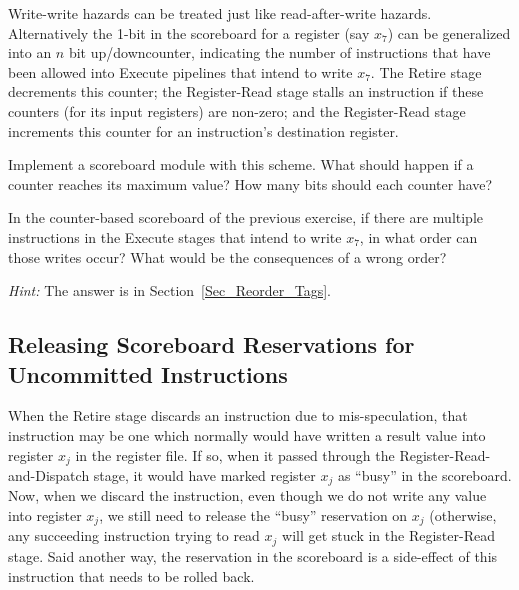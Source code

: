 \Exercise

Write-write hazards can be treated just like read-after-write hazards.
Alternatively the 1-bit in the scoreboard for a register (say $x_7$)
can be generalized into an $n$ bit up/downcounter, indicating the
number of instructions that have been allowed into Execute pipelines
that intend to write $x_7$.  The Retire stage decrements this counter;
the Register-Read stage stalls an instruction if these counters (for
its input registers) are non-zero; and the Register-Read stage
increments this counter for an instruction's destination register.

\vspace{1ex}

Implement a scoreboard module with this scheme.  What should happen if
a counter reaches its maximum value?  How many bits should each
counter have?

\vspace{1ex}

\Exercise

In the counter-based scoreboard of the previous exercise, if there are
multiple instructions in the Execute stages that intend to write
$x_7$, in what order can those writes occur?  What would be the
consequences of a wrong order?

\emph{Hint:} The answer is in Section~\ref{Sec_Reorder_Tags}.

\Endexercise


\subsection{Releasing Scoreboard Reservations for Uncommitted Instructions}

When the Retire stage discards an instruction due to mis-speculation,
that instruction may be one which normally would have written a result
value into register $x_j$ in the register file.  If so, when it passed
through the Register-Read-and-Dispatch stage, it would have marked
register $x_j$ as ``busy'' in the scoreboard.  Now, when we discard
the instruction, even though we do not write any value into register
$x_j$, we still need to release the ``busy'' reservation on $x_j$
(otherwise, any succeeding instruction trying to read $x_j$ will get
stuck in the Register-Read stage.  Said another way, the reservation
in the scoreboard is a side-effect of this instruction that needs to
be rolled back.

